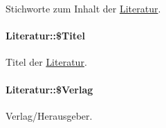 Stichworte zum Inhalt der \hyperlink{classLiteratur}{Literatur}. 

\hypertarget{classLiteratur_e30f9e9db9b396e6f87adfdb94e12ba0}{
\paragraph[\$Titel]{\setlength{\rightskip}{0pt plus 5cm}Literatur::\$Titel}\hfill}
\label{classLiteratur_e30f9e9db9b396e6f87adfdb94e12ba0}


Titel der \hyperlink{classLiteratur}{Literatur}. 

\hypertarget{classLiteratur_5f591208e5d21bb81e6c51484e2a60e0}{
\paragraph[\$Verlag]{\setlength{\rightskip}{0pt plus 5cm}Literatur::\$Verlag}\hfill}
\label{classLiteratur_5f591208e5d21bb81e6c51484e2a60e0}


Verlag/Herausgeber. 

